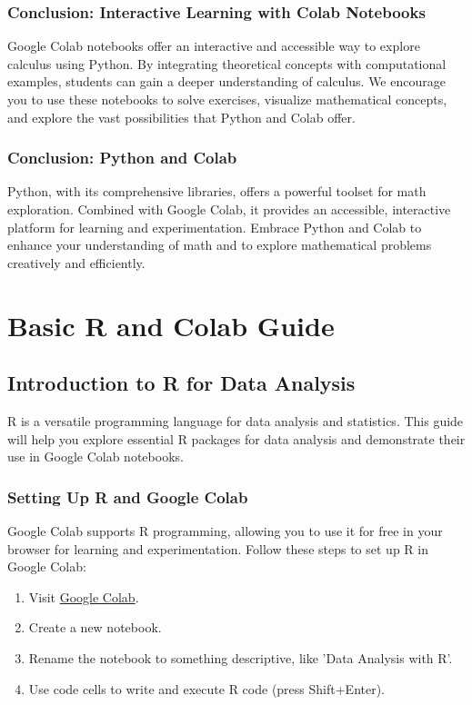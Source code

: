 \documentclass[a4paper,12pt]{book}
\newcounter{problem}
\newcounter{example}
\begin{document}
\subsection*{Conclusion: Interactive Learning with Colab Notebooks}

Google Colab notebooks offer an interactive and accessible way to explore calculus using Python. By integrating theoretical concepts with computational examples, students can gain a deeper understanding of calculus. We encourage you to use these notebooks to solve exercises, visualize mathematical concepts, and explore the vast possibilities that Python and Colab offer.


\subsection*{Conclusion: Python and Colab}

Python, with its comprehensive libraries, offers a powerful toolset for math exploration. Combined with Google Colab, it provides an accessible, interactive platform for learning and experimentation. Embrace Python and Colab to enhance your understanding of math and to explore mathematical problems creatively and efficiently.


\chapter{Basic R and Colab Guide}
\section*{Introduction to R for Data Analysis}

R is a versatile programming language for data analysis and statistics. This guide will help you explore essential R packages for data analysis and demonstrate their use in Google Colab notebooks.

\subsection*{Setting Up R and Google Colab}

Google Colab supports R programming, allowing you to use it for free in your browser for learning and experimentation. Follow these steps to set up R in Google Colab:

\begin{enumerate}
    \item Visit \href{https://colab.research.google.com/}{Google Colab}.
    \item Create a new notebook.
    \item Rename the notebook to something descriptive, like 'Data Analysis with R'.
    \item Use code cells to write and execute R code (press Shift+Enter).
\end{enumerate}
\end{document}
